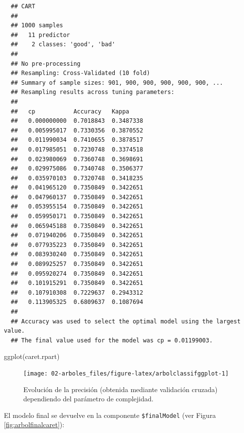 \documentclass[
]{book}
\newenvironment{Shaded}{\begin{snugshade}}{\end{snugshade}}
\newcommand{\FunctionTok}[1]{\textcolor[rgb]{0.00,0.00,0.00}{#1}}
\newcommand{\NormalTok}[1]{#1}
\newcommand{\SpecialCharTok}[1]{\textcolor[rgb]{0.00,0.00,0.00}{#1}}
\theoremstyle{break}
\theoremstyle{nonumberplain}
\begin{document}
\begin{verbatim}
  ## CART 
  ## 
  ## 1000 samples
  ##   11 predictor
  ##    2 classes: 'good', 'bad' 
  ## 
  ## No pre-processing
  ## Resampling: Cross-Validated (10 fold) 
  ## Summary of sample sizes: 901, 900, 900, 900, 900, 900, ... 
  ## Resampling results across tuning parameters:
  ## 
  ##   cp           Accuracy   Kappa    
  ##   0.000000000  0.7018843  0.3487338
  ##   0.005995017  0.7330356  0.3870552
  ##   0.011990034  0.7410655  0.3878517
  ##   0.017985051  0.7230748  0.3374518
  ##   0.023980069  0.7360748  0.3698691
  ##   0.029975086  0.7340748  0.3506377
  ##   0.035970103  0.7320748  0.3418235
  ##   0.041965120  0.7350849  0.3422651
  ##   0.047960137  0.7350849  0.3422651
  ##   0.053955154  0.7350849  0.3422651
  ##   0.059950171  0.7350849  0.3422651
  ##   0.065945188  0.7350849  0.3422651
  ##   0.071940206  0.7350849  0.3422651
  ##   0.077935223  0.7350849  0.3422651
  ##   0.083930240  0.7350849  0.3422651
  ##   0.089925257  0.7350849  0.3422651
  ##   0.095920274  0.7350849  0.3422651
  ##   0.101915291  0.7350849  0.3422651
  ##   0.107910308  0.7229637  0.2943312
  ##   0.113905325  0.6809637  0.1087694
  ## 
  ## Accuracy was used to select the optimal model using the largest value.
  ## The final value used for the model was cp = 0.01199003.
\end{verbatim}

\begin{Shaded}
\begin{Highlighting}[]
\FunctionTok{ggplot}\NormalTok{(caret.rpart)}
\end{Highlighting}
\end{Shaded}

\begin{figure}[!htb]

{\centering \texttt{[image: 02-arboles\_files/figure-latex/arbolclassifggplot-1]} 

}

\caption{Evolución de la precisión (obtenida mediante validación cruzada) dependiendo del parámetro de complejidad.}\label{fig:arbolclassifggplot}
\end{figure}

El modelo final se devuelve en la componente \texttt{\$finalModel} (ver Figura \ref{fig:arbolfinalcaret}):



\begin{Shaded}
\end{Shaded}
\end{document}
